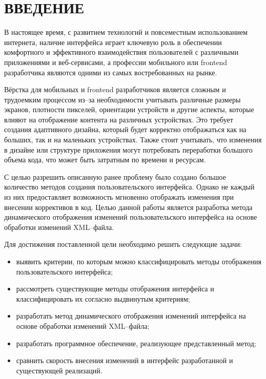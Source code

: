 \section*{ВВЕДЕНИЕ}

В настоящее время, с развитием технологий и повсеместным использованием интернета, наличие интерфейса играет ключевую роль в обеспечении комфортного и эффективного взаимодействия пользователей с различными приложениями и веб-сервисами, а профессии мобильного или frontend разработчика являются одними из самых востребованных на рынке. 

Вёрстка для мобильных и frontend разработчиков является сложным и трудоемким процессом из--за необходимости учитывать различные размеры экранов, плотности пикселей, ориентации устройств и другие аспекты, которые влияют на отображение контента на различных устройствах. 
Это требует создания адаптивного дизайна, который будет корректно отображаться как на больших, так и на маленьких устройствах. 
Также стоит учитывать, что изменения в дизайне или структуре приложения могут потребовать переработки большого объема кода, что может быть затратным по времени и ресурсам. 

С целью разрешить описанную ранее проблему было создано большое количество методов создания пользовательского интерфейса. 
Однако не каждый из них предоставляет возможность мгновенно отображать изменения при внесении коррективов в код. 
Целью данной работы является разработка метода динамического отображения изменений пользовательского интерфейса на основе обработки изменений XML--файла.

Для достижения поставленной цели необходимо решить следующие задачи:

\begin{itemize}[label=---]
	\item выявить критерии, по которым можно классифицировать методы отображения пользовательского интерфейса;
	\item рассмотреть существующие методы отображения интерфейса и классифицировать их согласно выдвинутым критериям;
	\item разработать метод динамического отображения изменений интерфейса на основе обработки изменений XML--файла;
	\item разработать программное обеспечение, реализующее представленный метод;
	\item сравнить скорость внесения изменений в интерфейс разработанной и существующей реализаций.
\end{itemize}

\pagebreak
